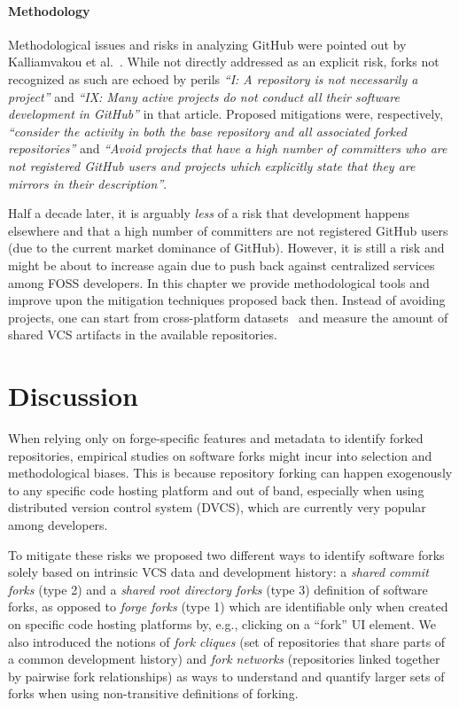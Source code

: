 \paragraph{Methodology}

Methodological issues and risks in analyzing GitHub were pointed out by
Kalliamvakou et al.~\cite{kalliamvakou2014promises}. While not directly
addressed as an explicit risk, forks not recognized as such are echoed by
perils \emph{``I\@: A repository is not necessarily a project''} and
\emph{``IX\@: Many active projects do not conduct all their software
development in GitHub''} in that article. Proposed mitigations were,
respectively,
\emph{``consider the activity in both the base repository and all associated
  forked repositories''} and \emph{``Avoid projects that have a high number of
  committers who are not registered GitHub users and projects which explicitly
  state that they are mirrors in their description''}.

Half a decade later, it is arguably \emph{less} of a risk that development
happens elsewhere and that a high number of committers are not registered
GitHub users (due to the current market dominance of GitHub). However, it is
still a risk and might be about to increase again due to push back against
centralized services among FOSS developers.  In this chapter we provide
methodological tools and improve upon the mitigation techniques proposed back
then. Instead of avoiding projects, one can start from cross-platform
datasets~\cite{swhcacm2018, swh-provenance-emse, swh-msr2019-dataset,
mockus2019woc} and measure the amount of shared VCS artifacts in the available
repositories.


\section{Discussion}%
\label{sec:forks-conclusion}

When relying only on forge-specific features and metadata to identify forked
repositories, empirical studies on software forks might incur into selection
and methodological biases. This is because repository forking can happen
exogenously to any specific code hosting platform and out of band, especially
when using distributed version control system (DVCS), which are currently very
popular among developers.

To mitigate these risks we proposed two different ways to identify software
forks solely based on intrinsic VCS data and development history: a
\emph{shared commit forks} (type 2) and a \emph{shared root directory forks}
(type 3) definition of software forks, as opposed to \emph{forge forks} (type
1) which are identifiable only when created on specific code hosting platforms
by, e.g., clicking on a ``fork'' UI element.  We also introduced the notions of
\emph{fork cliques} (set of repositories that share parts of a common
development history) and \emph{fork networks} (repositories linked together by
pairwise fork relationships) as ways to understand and quantify larger sets of
forks when using non-transitive definitions of forking.

